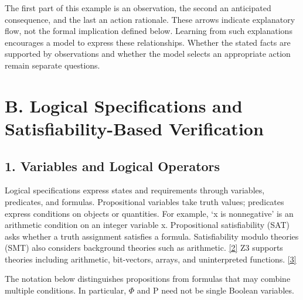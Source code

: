 \documentclass[11pt,a4paper]{article}
\begin{document}
The first part of this example is an observation, the second an anticipated consequence, and the last an action rationale. These arrows indicate explanatory flow, not the formal implication defined below. Learning from such explanations encourages a model to express these relationships. Whether the stated facts are supported by observations and whether the model selects an appropriate action remain separate questions.\par

\section*{B. Logical Specifications and Satisfiability-Based Verification}

\subsection*{1. Variables and Logical Operators}

Logical specifications express states and requirements through variables, predicates, and formulas. Propositional variables take truth values; predicates express conditions on objects or quantities. For example, ‘x is nonnegative’ is an arithmetic condition on an integer variable x. Propositional satisfiability (SAT) asks whether a truth assignment satisfies a formula. Satisfiability modulo theories (SMT) also considers background theories such as arithmetic. \href{\detokenize{https://theory.stanford.edu/~barrett/pubs/BT18.pdf}}{[2]} Z3 supports theories including arithmetic, bit-vectors, arrays, and uninterpreted functions. \href{\detokenize{https://doi.org/10.1007/978-3-540-78800-3_24}}{[3]}\par

The notation below distinguishes propositions from formulas that may combine multiple conditions. In particular, \ensuremath{\Phi} and P need not be single Boolean variables.\par
\end{document}
